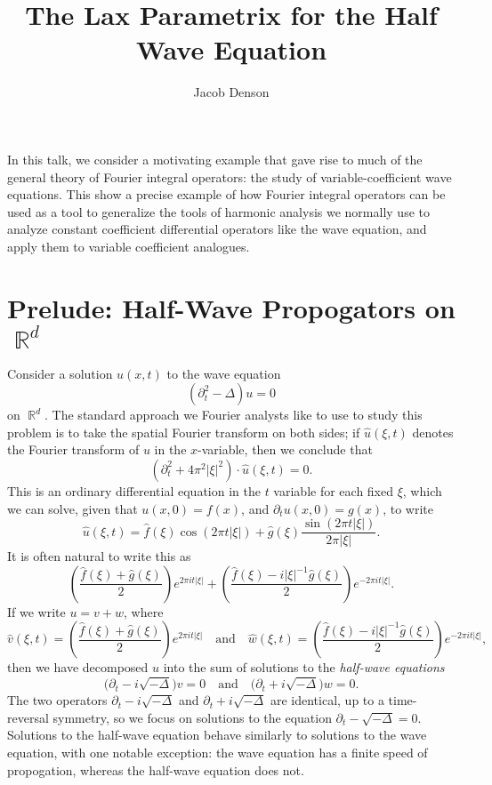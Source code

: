 \documentclass{article}
\title{The Lax Parametrix for the Half Wave Equation}
\author{Jacob Denson}
\theoremstyle{plain}
\theoremstyle{remark}
\theoremstyle{definition}
\DeclareMathOperator{\RR}{\mathbb{R}}
\begin{document}
\maketitle

In this talk, we consider a motivating example that gave rise to much of the general theory of Fourier integral operators: the study of variable-coefficient wave equations. This show a precise example of how Fourier integral operators can be used as a tool to generalize the tools of harmonic analysis we normally use to analyze constant coefficient differential operators like the wave equation, and apply them to variable coefficient analogues.

\section{Prelude: Half-Wave Propogators on $\RR^d$}

Consider a solution $u(x,t)$ to the wave equation
%
\[ (\partial_t^2 - \Delta) u = 0 \]
%
on $\RR^d$. The standard approach we Fourier analysts like to use to study this problem is to take the spatial Fourier transform on both sides; if $\widehat{u}(\xi,t)$ denotes the Fourier transform of $u$ in the $x$-variable, then we conclude that
%
\[ (\partial_t^2 + 4 \pi^2 |\xi|^2) \cdot \widehat{u}(\xi,t) = 0. \]
%
This is an ordinary differential equation in the $t$ variable for each fixed $\xi$, which we can solve, given that $u(x,0) = f(x)$, and $\partial_t u(x,0) = g(x)$, to write
%
\[ \widehat{u}(\xi,t) = \widehat{f}(\xi) \cos(2 \pi t |\xi|) + \widehat{g}(\xi) \frac{\sin(2 \pi t |\xi|)}{2 \pi |\xi|}. \]
%
It is often natural to write this as
%
\[ \left( \frac{\widehat{f}(\xi) + \widehat{g}(\xi)}{2} \right) e^{2 \pi i t |\xi|} + \left( \frac{\widehat{f}(\xi) - i |\xi|^{-1} \widehat{g}(\xi)}{2} \right) e^{-2 \pi i t |\xi|}. \]
%
If we write $u = v + w$, where
%
\[ \widehat{v}(\xi,t) = \left( \frac{\widehat{f}(\xi) + \widehat{g}(\xi)}{2} \right) e^{2 \pi i t |\xi|} \quad\text{and}\quad \widehat{w}(\xi,t) = \left( \frac{\widehat{f}(\xi) - i |\xi|^{-1} \widehat{g}(\xi)}{2} \right) e^{-2 \pi i t |\xi|}, \]
%
then we have decomposed $u$ into the sum of solutions to the \emph{half-wave equations}
%
\[ \Big( \partial_t - i \sqrt{-\Delta} \Big) v = 0 \quad\text{and}\quad \Big(\partial_t + i \sqrt{-\Delta} \Big) w = 0. \]
%
The two operators $\partial_t - i \sqrt{-\Delta}$ and $\partial_t + i \sqrt{-\Delta}$ are identical, up to a time-reversal symmetry, so we focus on solutions to the equation $\partial_t - \sqrt{-\Delta} = 0$. Solutions to the half-wave equation behave similarly to solutions to the wave equation, with one notable exception: the wave equation has a finite speed of propogation, whereas the half-wave equation does not.
\end{document}

